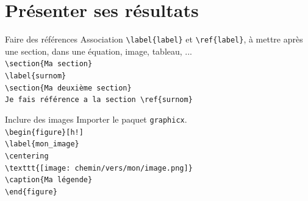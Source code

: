 \documentclass[handout]{beamer}
\begin{document}
\section{Présenter ses résultats}
\begin{frame}[fragile]{Faire des références}
	Association \texttt{\textbackslash label\{label\}} et \texttt{\textbackslash ref\{label\}}, à mettre après une section, dans une équation, image, tableau, ...\\[11pt]
	\verb|\section{Ma section}|\\
	\verb|\label{surnom}|\\[11pt]
	\verb|\section{Ma deuxième section}|\\[11pt]
	\verb|Je fais référence a la section \ref{surnom}|
	
\end{frame}
\begin{frame}[fragile]{Inclure des images}
Importer le paquet \texttt{graphicx}.\\[11pt]
\verb|\begin{figure}[h!]|\\
\verb|\label{mon_image}|\\
\verb|\centering|\\
\verb|\texttt{[image: chemin/vers/mon/image.png]}|\\
\verb|\caption{Ma légende}|\\
\verb|\end{figure}|
\end{frame}
\end{document}
